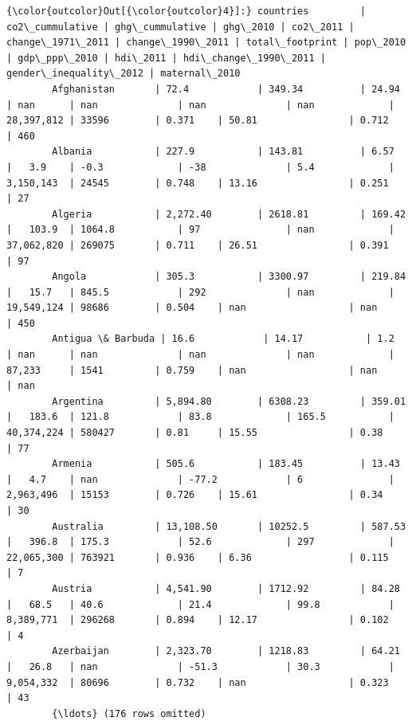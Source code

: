 \documentclass[11pt]{article}
\begin{document}
\begin{Verbatim}[commandchars=\\\{\}]
{\color{outcolor}Out[{\color{outcolor}4}]:} countries         | co2\_cummulative | ghg\_cummulative | ghg\_2010 | co2\_2011 | change\_1971\_2011 | change\_1990\_2011 | total\_footprint | pop\_2010   | gdp\_ppp\_2010 | hdi\_2011 | hdi\_change\_1990\_2011 | gender\_inequality\_2012 | maternal\_2010
        Afghanistan       | 72.4            | 349.34          | 24.94    | nan      | nan              | nan              | nan             | 28,397,812 | 33596        | 0.371    | 50.81                | 0.712                  | 460
        Albania           | 227.9           | 143.81          | 6.57     |   3.9    | -0.3             | -38              | 5.4             | 3,150,143  | 24545        | 0.748    | 13.16                | 0.251                  | 27
        Algeria           | 2,272.40        | 2618.81         | 169.42   |   103.9  | 1064.8           | 97               | nan             | 37,062,820 | 269075       | 0.711    | 26.51                | 0.391                  | 97
        Angola            | 305.3           | 3300.97         | 219.84   |   15.7   | 845.5            | 292              | nan             | 19,549,124 | 98686        | 0.504    | nan                  | nan                    | 450
        Antigua \& Barbuda | 16.6            | 14.17           | 1.2      | nan      | nan              | nan              | nan             | 87,233     | 1541         | 0.759    | nan                  | nan                    | nan
        Argentina         | 5,894.80        | 6308.23         | 359.01   |   183.6  | 121.8            | 83.8             | 165.5           | 40,374,224 | 580427       | 0.81     | 15.55                | 0.38                   | 77
        Armenia           | 505.6           | 183.45          | 13.43    |   4.7    | nan              | -77.2            | 6               | 2,963,496  | 15153        | 0.726    | 15.61                | 0.34                   | 30
        Australia         | 13,108.50       | 10252.5         | 587.53   |   396.8  | 175.3            | 52.6             | 297             | 22,065,300 | 763921       | 0.936    | 6.36                 | 0.115                  | 7
        Austria           | 4,541.90        | 1712.92         | 84.28    |   68.5   | 40.6             | 21.4             | 99.8            | 8,389,771  | 296268       | 0.894    | 12.17                | 0.102                  | 4
        Azerbaijan        | 2,323.70        | 1218.83         | 64.21    |   26.8   | nan              | -51.3            | 30.3            | 9,054,332  | 80696        | 0.732    | nan                  | 0.323                  | 43
        {\ldots} (176 rows omitted)
\end{Verbatim}
            
\end{document}
